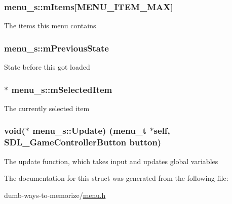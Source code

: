 \subsubsection[{\texorpdfstring{m\+Items}{mItems}}]{ menu\+\_\+s\+::m\+Items\mbox{[}{\bf M\+E\+N\+U\+\_\+\+I\+T\+E\+M\+\_\+\+M\+AX}\mbox{]}}\hypertarget{structmenu__s_a6a7f46ad3a4345af651ed2bc3825d305}{}\label{structmenu__s_a6a7f46ad3a4345af651ed2bc3825d305}
The items this menu contains 
\subsubsection[{\texorpdfstring{m\+Previous\+State}{mPreviousState}}]{ menu\+\_\+s\+::m\+Previous\+State}\hypertarget{structmenu__s_aa701766eb0f926ab2e7d1e2a17e93a7e}{}\label{structmenu__s_aa701766eb0f926ab2e7d1e2a17e93a7e}
State before this got loaded 
\subsubsection[{\texorpdfstring{m\+Selected\+Item}{mSelectedItem}}]{$\ast$ menu\+\_\+s\+::m\+Selected\+Item}\hypertarget{structmenu__s_a40269f7846734c2bf745d089a2b71f25}{}\label{structmenu__s_a40269f7846734c2bf745d089a2b71f25}
The currently selected item 
\subsubsection[{\texorpdfstring{Update}{Update}}]{\setlength{\rightskip}{0pt plus 5cm}void($\ast$ menu\+\_\+s\+::\+Update) ({\bf menu\+\_\+t} $\ast$self, S\+D\+L\+\_\+\+Game\+Controller\+Button button)}\hypertarget{structmenu__s_aa49d774f3511e81ba1ea31a92378abf7}{}\label{structmenu__s_aa49d774f3511e81ba1ea31a92378abf7}
The update function, which takes input and updates global variables 

The documentation for this struct was generated from the following file\+:\begin{DoxyCompactItemize}
\item 
dumb-\/ways-\/to-\/memorize/\hyperlink{menu_8h}{menu.\+h}\end{DoxyCompactItemize}
